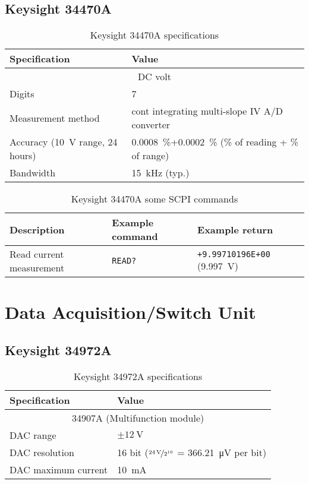 \subsection{Keysight 34470A}
\begin{table}[H]
	\centering
	\caption{Keysight 34470A specifications}
	\label{tab:keysight-34470A-specs}
	\begin{tabular}{ll}
		\toprule
		\textbf{Specification} & \textbf{Value}\\
		\midrule
		\multicolumn{2}{c}{DC volt}\\
		Digits & 7~\nicefrac{1}{2}\\
		Measurement method & cont integrating multi-slope IV A/D converter\\
		Accuracy (\SI{10}{\volt} range, 24 hours) & \SI{0.0008}{\percent}+\SI{0.0002}{\percent} (\si{\percent} of reading + \si{\percent} of range)\\
		Bandwidth & \SI{15}{\kHz} (typ.)\\
		
		
		\bottomrule
	\end{tabular}
\end{table}

\begin{table}[H]
	\centering
	\caption{Keysight 34470A some SCPI commands}
	\label{tab:keysight-34470A-scpi}
	\begin{tabularx}{\textwidth}{Xll}
		\toprule
		\textbf{Description} & \textbf{Example command} & \textbf{Example return}\\
		\midrule
		Read current measurement & \texttt{READ?} & \texttt{+9.99710196E+00} (\SI{9.997}{\volt})\\
		\bottomrule
	\end{tabularx}
\end{table}

\section{Data Acquisition/Switch Unit}
\subsection{Keysight 34972A}
\begin{table}[H]
	\centering
	\caption{Keysight 34972A specifications}
	\label{tab:keysight-34972A-specs}
	\begin{tabular}{ll}
		\toprule
		\textbf{Specification} & \textbf{Value}\\
		\midrule
		\multicolumn{2}{c}{34907A (Multifunction module)}\\
		DAC range & $\pm \SI{12}{\volt}$ \\
		DAC resolution & 16 bit ($\nicefrac{\SI{24}{\volt}}{2^{16}}$ = \SI{366.21}{\micro\volt} per bit) \\
		DAC maximum current & \SI{10}{\mA} \\
		\bottomrule
	\end{tabular}
\end{table}

